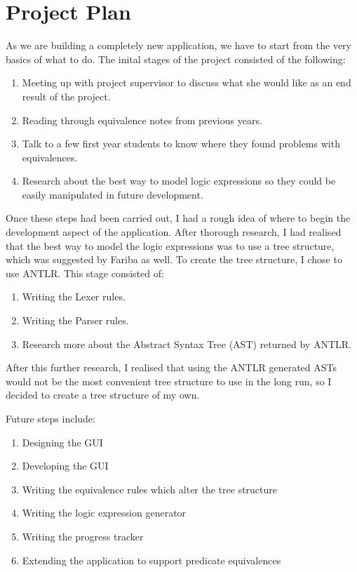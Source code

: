 \documentclass[12pt]{article}
\begin{document}
\newpage

\section{Project Plan}
As we are building a completely new application, we have to start from the
very basics of what to do. The inital stages of the project consisted of the
following:
\begin{enumerate}
	\item Meeting up with project supervisor to discuss what she would like as
				 an end result of the project.
	\item Reading through equivalence notes from previous years.
	\item Talk to a few first year students to know where they found problems
				 with equivalences.
	\item Research about the best way to model logic expressions so they could
   			 be easily manipulated in future development.
\end{enumerate}

Once these steps had been carried out, I had a rough idea of where to begin 
the development aspect of the application. After thorough research, I had realised
that the best way to model the logic expressions was to use a tree structure, which
was suggested by Fariba as well. To create the tree structure, I chose to use
ANTLR. This stage consisted of:

\begin{enumerate}
	\item Writing the Lexer rules.
	\item Writing the Parser rules.
	\item Research more about the Abstract Syntax Tree (AST) returned by ANTLR.
\end{enumerate}

After this further research, I realised that using the ANTLR generated ASTs would
not be the most convenient tree structure to use in the long run, so I decided
to create a tree structure of my own.

Future steps include:
\begin{enumerate}
	\item Designing the GUI
	\item Developing the GUI
	\item Writing the equivalence rules which alter the tree structure
	\item Writing the logic expression generator
	\item Writing the progress tracker
  \item Extending the application to support predicate equivalences
\end{enumerate}
\newpage
\end{document}
